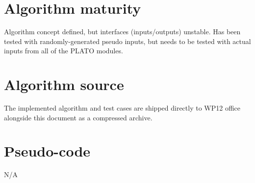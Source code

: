 \documentclass[a4paper, oneside, 11pt, article, english]{memoir}
\begin{document}
\section{Algorithm maturity}
\label{sec:mature}

Algorithm concept defined, but interfaces (inputs/outputs) unstable. 
Has been tested with randomly-generated pseudo inputs, but needs to be tested with actual inputs from all of the PLATO modules. 

\iffalse
{
  \itshape

  Please specify the maturity level of the algorithm and do not hesitate to
  provide any further information on the current status of the algorithm. The
  convention for algorithm maturity is defined as:

  \begin{itemize}
    \firmlist
  \item algorithm not defined
  \item algorithm concept defined, but interfaces (inputs/outputs) unstable
  \item algorithm concept defined and interfaces (inputs/outputs) stable, but
    not all processing steps stable
  \item no change or only minor changes expected
  \end{itemize}

}
\fi

\section{Algorithm source}
\label{sec:source}

The implemented algorithm and test cases are shipped directly to WP12 office alongside this document as a compressed archive.



\section{Pseudo-code}
\label{sec:pseudo}

N/A

\end{document}
